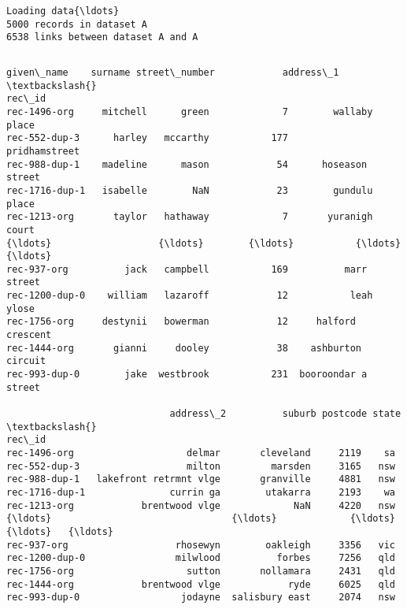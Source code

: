 \documentclass{article}
\begin{document}
    \begin{Verbatim}[commandchars=\\\{\}]

\end{Verbatim}

    \begin{Verbatim}[commandchars=\\\{\}]
Loading data{\ldots}
5000 records in dataset A
6538 links between dataset A and A

    \end{Verbatim}

    \begin{Verbatim}[commandchars=\\\{\}]

\end{Verbatim}
\begin{Verbatim}[commandchars=\\\{\}]
               given\_name    surname street\_number            address\_1  \textbackslash{}
rec\_id                                                                    
rec-1496-org     mitchell      green             7        wallaby place   
rec-552-dup-3      harley   mccarthy           177        pridhamstreet   
rec-988-dup-1    madeline      mason            54      hoseason street   
rec-1716-dup-1   isabelle        NaN            23        gundulu place   
rec-1213-org       taylor   hathaway             7       yuranigh court   
{\ldots}                   {\ldots}        {\ldots}           {\ldots}                  {\ldots}   
rec-937-org          jack   campbell           169          marr street   
rec-1200-dup-0    william   lazaroff            12           leah ylose   
rec-1756-org     destynii   bowerman            12     halford crescent   
rec-1444-org       gianni     dooley            38    ashburton circuit   
rec-993-dup-0        jake  westbrook           231  booroondar a street   

                             address\_2          suburb postcode state  \textbackslash{}
rec\_id                                                                  
rec-1496-org                    delmar       cleveland     2119    sa   
rec-552-dup-3                   milton         marsden     3165   nsw   
rec-988-dup-1   lakefront retrmnt vlge       granville     4881   nsw   
rec-1716-dup-1               currin ga        utakarra     2193    wa   
rec-1213-org            brentwood vlge             NaN     4220   nsw   
{\ldots}                                {\ldots}             {\ldots}      {\ldots}   {\ldots}   
rec-937-org                   rhosewyn        oakleigh     3356   vic   
rec-1200-dup-0                milwlood          forbes     7256   qld   
rec-1756-org                    sutton       nollamara     2431   qld   
rec-1444-org            brentwood vlge            ryde     6025   qld   
rec-993-dup-0                  jodayne  salisbury east     2074   nsw   


\end{Verbatim}
\end{document}
